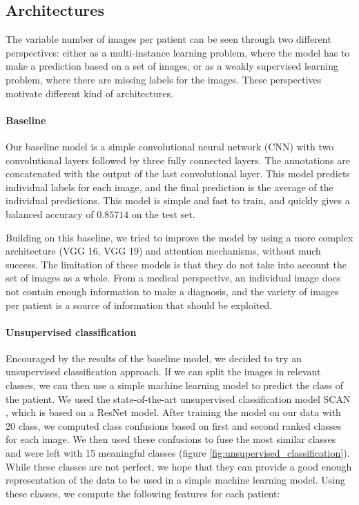 \documentclass{midl}
\begin{document}
\subsection{Architectures}

The variable number of images per patient can be seen through two different perspectives: either as a multi-instance learning problem, where the model has to make a prediction based on a set of images, or as a weakly supervised learning problem, where there are missing labels for the images. These perspectives motivate different kind of architectures.

\paragraph*{Baseline}

Our baseline model is a simple convolutional neural network (CNN) with two convolutional layers followed by three fully connected layers. The annotations are concatenated with the output of the last convolutional layer. This model predicts individual labels for each image, and the final prediction is the average of the individual predictions. This model is simple and fast to train, and quickly gives a balanced accuracy of $0.85714$ on the test set.

Building on this baseline, we tried to improve the model by using a more complex architecture (VGG 16, VGG 19) and attention mechanisms, without much success. The limitation of these models is that they do not take into account the set of images as a whole. From a medical perspective, an individual image does not contain enough information to make a diagnosis, and the variety of images per patient is a source of information that should be exploited.

\paragraph*{Unsupervised classification}

Encouraged by the results of the baseline model, we decided to try an unsupervised classification approach. If we can split the images in relevant classes, we can then use a simple machine learning model to predict the class of the patient. We used the state-of-the-art unsupervised classification model SCAN \cite{van-gansbeke-2020}, which is based on a ResNet model. After training the model on our data with 20 class, we computed class confusions based on first and second ranked classes for each image. We then used these confusions to fuse the most similar classes and were left with 15 meaningful classes (figure \ref{fig:unsupervised_classification}). While these classes are not perfect, we hope that they can provide a good enough representation of the data to be used in a simple machine learning model. Using these classes, we compute the following features for each patient:
\end{document}
